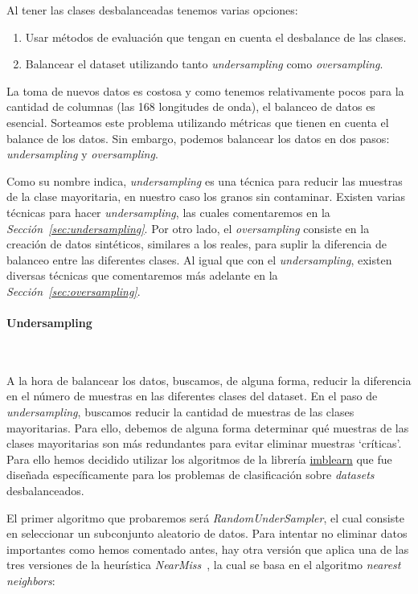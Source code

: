 Al tener las clases desbalanceadas tenemos varias opciones:
\begin{enumerate}
    \item Usar métodos de evaluación que tengan en cuenta el desbalance de las clases.
    \item Balancear el \gls{dataset} utilizando tanto \textit{undersampling} como \textit{oversampling}.
\end{enumerate}

La toma de nuevos datos es costosa y como tenemos relativamente pocos para la cantidad de columnas (las 168 longitudes de onda), el balanceo de datos es esencial. Sorteamos este problema utilizando métricas que tienen en cuenta el balance de los datos. Sin embargo, podemos balancear los datos en dos pasos: \textit{undersampling} y \textit{oversampling}. 

Como su nombre indica, \textit{undersampling} es una técnica para reducir las muestras de la clase mayoritaria, en nuestro caso los granos sin contaminar. Existen varias técnicas para hacer \textit{undersampling}, las cuales comentaremos en la \textit{Sección\ \ref{sec:undersampling}}. Por otro lado, el \textit{oversampling} consiste en la creación de datos sintéticos, similares a los reales, para suplir la diferencia de balanceo entre las diferentes clases. Al igual que con el \textit{undersampling}, existen diversas técnicas que comentaremos más adelante en la \textit{Sección\ \ref{sec:oversampling}}.

\paragraph{Undersampling}\ \label{sec:undersampling}


A la hora de balancear los datos, buscamos, de alguna forma, reducir la diferencia en el número de muestras en las diferentes clases del dataset. En el paso de \textit{undersampling}, buscamos reducir la cantidad de muestras de las clases mayoritarias. Para ello, debemos de alguna forma determinar qué muestras de las clases mayoritarias son más redundantes para evitar eliminar muestras `críticas'. Para ello hemos decidido utilizar los algoritmos de la librería \href{https://imbalanced-learn.org/stable/}{imblearn} que fue diseñada específicamente para los problemas de clasificación sobre \textit{datasets} desbalanceados.\ \cite{3Undersa98:online}

El primer algoritmo que probaremos será \textit{RandomUnderSampler}, el cual consiste en seleccionar un subconjunto aleatorio de datos. Para intentar no eliminar datos importantes como hemos comentado antes, hay otra versión que aplica una de las tres versiones de la heurística \textit{NearMiss}\ \cite{3Undersa98:online}, la cual se basa en el algoritmo \textit{nearest neighbors}:

